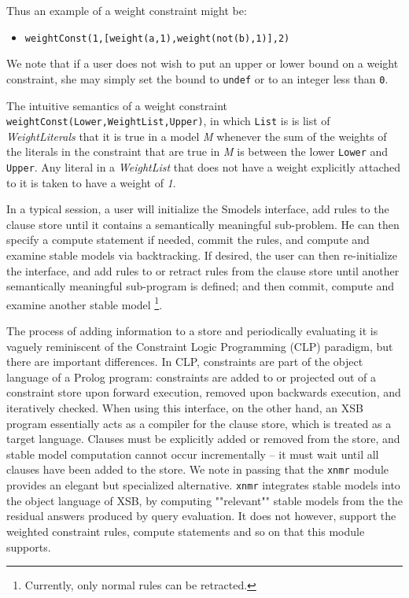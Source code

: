 Thus an example of a weight constraint might be: 
\begin{itemize}
\item {\tt weightConst(1,[weight(a,1),weight(not(b),1)],2)}
\end{itemize}
We note that if a user does not wish to put an upper or lower bound on
a weight constraint, she may simply set the bound to {\tt undef} or to
an integer less than {\tt 0}.  
 
The intuitive semantics of a weight constraint
{\tt weightConst(Lower,WeightList,Upper)}, in which {\tt List} is is
list of \emph{WeightLiterals} that it is true in a model \emph{M} whenever
the sum of the weights of the literals in the constraint that are true
in \emph{M} is between the lower {\tt Lower} and {\tt Upper}.  Any literal
in a \emph{WeightList} that does not have a weight explicitly attached
to it is taken to have a weight of \emph{1}.

In a typical session, a user will initialize the Smodels interface,
add rules to the clause store until it contains a semantically
meaningful sub-problem.  He can then specify a compute statement if
needed, commit the rules, and compute and examine stable models via
backtracking.  If desired, the user can then re-initialize the
interface, and add rules to or retract rules from the clause store
until another semantically meaningful sub-program is defined; and then
commit, compute and examine another stable model \footnote{Currently,
only normal rules can be retracted.}.

The process of adding information to a store and periodically
evaluating it is vaguely reminiscent of the Constraint Logic
Programming (CLP) paradigm, but there are important differences.  In
CLP, constraints are part of the object language of a Prolog program:
constraints are added to or projected out of a constraint store upon
forward execution, removed upon backwards execution, and iteratively
checked.  When using this interface, on the other hand, an XSB program
essentially acts as a compiler for the clause store, which is treated
as a target language.  Clauses must be explicitly added or removed
from the store, and stable model computation cannot occur
incrementally -- it must wait until all clauses have been added to the
store.  We note in passing that the {\tt xnmr} module provides an
elegant but specialized alternative.  {\tt xnmr} integrates stable
models into the object language of XSB, by computing ""relevant""
stable models from the the residual answers produced by query
evaluation.  It does not however, support the weighted constraint
rules, compute statements and so on that this module supports.

